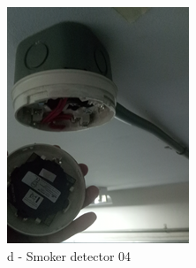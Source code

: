 \begin{figure}[h]
\begin{minipage}[b]{0.22\linewidth}
		\includegraphics[width=\textwidth]{figures/ch05_fdas_sd04}
		\caption*{d - Smoker detector 04}
	\end{minipage}
	\hspace{0.03cm}
	\begin{minipage}[b]{0.22\linewidth}
		\centering

\end{minipage}
\end{figure}
